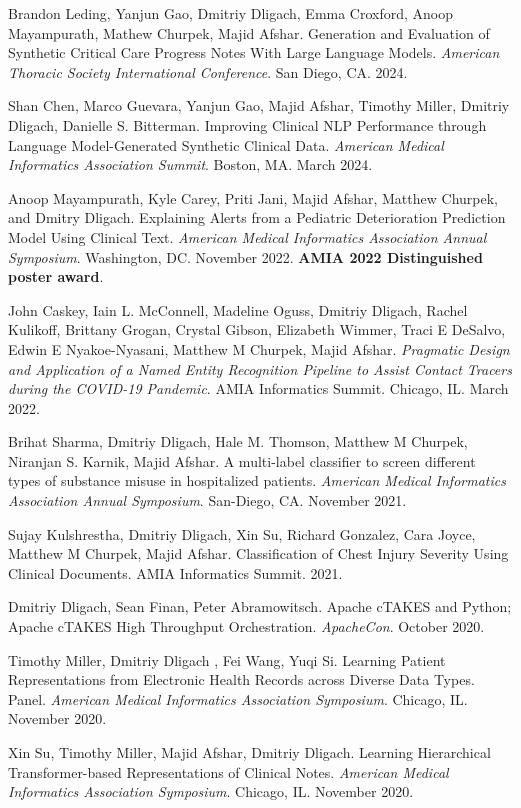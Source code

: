 \documentclass[letterpaper]{article}
\renewenvironment{itemize}{
  \begin{list}{}{
    \setlength{\leftmargin}{1.5em}
  }
}{
  \end{list}
}
\begin{document}
\begin{itemize}
\item Brandon Leding, Yanjun Gao, Dmitriy Dligach, Emma Croxford, Anoop Mayampurath, Mathew Churpek, Majid Afshar. Generation and Evaluation of Synthetic Critical Care Progress Notes With Large Language Models. \emph{American Thoracic Society International Conference}. San Diego, CA. 2024.
\item Shan Chen, Marco Guevara, Yanjun Gao, Majid Afshar, Timothy Miller, Dmitriy Dligach, Danielle S. Bitterman. Improving Clinical NLP Performance through Language Model-Generated Synthetic Clinical Data. \emph{American Medical Informatics Association Summit}. Boston, MA. March 2024.
\item Anoop Mayampurath, Kyle Carey, Priti Jani, Majid Afshar, Matthew Churpek, and Dmitry Dligach. Explaining Alerts from a Pediatric Deterioration Prediction Model Using Clinical Text. \emph{American Medical Informatics Association Annual Symposium}. Washington, DC. November 2022. \textbf{AMIA 2022 Distinguished poster award}.
\item John Caskey, Iain L. McConnell, Madeline Oguss, Dmitriy Dligach, Rachel Kulikoff,  Brittany Grogan, Crystal Gibson, Elizabeth Wimmer, Traci E DeSalvo, Edwin E Nyakoe-Nyasani, Matthew M Churpek, Majid Afshar. \emph{Pragmatic Design and Application of a Named Entity Recognition Pipeline to Assist Contact Tracers during the COVID-19 Pandemic}. AMIA Informatics Summit. Chicago, IL. March 2022.
\item Brihat Sharma, Dmitriy Dligach, Hale M. Thomson, Matthew M Churpek, Niranjan S. Karnik, Majid Afshar. A multi-label classifier to screen different types of substance misuse in hospitalized patients. \emph{American Medical Informatics Association Annual Symposium}. San-Diego, CA. November 2021.
\item Sujay Kulshrestha, Dmitriy Dligach, Xin Su, Richard Gonzalez, Cara Joyce, Matthew M Churpek, Majid Afshar. Classification of Chest Injury Severity Using Clinical Documents. AMIA Informatics Summit. 2021.
\item Dmitriy Dligach, Sean Finan, Peter Abramowitsch. Apache cTAKES and Python; Apache cTAKES High Throughput Orchestration. \emph{ApacheCon}. October 2020.
\item Timothy Miller, Dmitriy Dligach , Fei Wang, Yuqi Si. Learning Patient Representations from Electronic Health Records across Diverse Data Types. Panel. \emph{American Medical Informatics Association Symposium}. Chicago, IL. November 2020.
\item Xin Su, Timothy Miller, Majid Afshar, Dmitriy Dligach. Learning Hierarchical Transformer-based Representations of Clinical Notes. \emph{American Medical Informatics Association Symposium}. Chicago, IL. November 2020.

\end{itemize}
\end{document}
